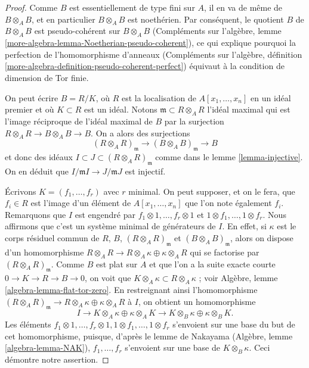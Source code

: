\begin{proof}
Comme $B$ est essentiellement de type fini sur $A$, il en va de même de $B \otimes_A B$, et
en particulier $B \otimes_A B$ est noethérien. Par conséquent, le quotient $B$ de
$B \otimes_A B$ est pseudo-cohérent sur $B \otimes_A B$
(Compléments sur l'algèbre, lemme \ref{more-algebra-lemma-Noetherian-pseudo-coherent}),
ce qui explique pourquoi la perfection de l'homomorphisme d'anneaux (Compléments sur l'algèbre, définition
\ref{more-algebra-definition-pseudo-coherent-perfect}) équivaut à la
condition de dimension de Tor finie.

\medskip\noindent
On peut écrire $B = R/K$, où $R$ est la localisation de $A[x_1, \ldots, x_n]$
en un idéal premier et où $K \subset R$ est un idéal. Notons
$\mathfrak m \subset R \otimes_A R$ l'idéal maximal qui est l'image réciproque
de l'idéal maximal de $B$ par la surjection
$R \otimes_A R \to B \otimes_A B \to B$. On a alors des surjections
$$
(R \otimes_A R)_\mathfrak m \to (B \otimes_A B)_\mathfrak m \to B
$$
et donc des idéaux $I \subset J \subset (R \otimes_A R)_\mathfrak m$
comme dans le lemme \ref{lemma-injective}. On en déduit que
$I/\mathfrak m I \to J/\mathfrak m J$ est injectif.

\medskip\noindent
Écrivons $K = (f_1, \ldots, f_r)$ avec $r$ minimal. On peut supposer, et on le fera,
que $f_i \in R$ est l'image d'un élément de $A[x_1, \ldots, x_n]$ que l'on
note également $f_i$. Remarquons que $I$ est engendré
par $f_1 \otimes 1, \ldots, f_r \otimes 1$ et
$1 \otimes f_1, \ldots, 1 \otimes f_r$. Nous affirmons que c'est un système minimal
de générateurs de $I$. En effet, si $\kappa$ est le corps résiduel commun
de $R$, $B$, $(R \otimes_A R)_\mathfrak m$ et $(B \otimes_A B)_\mathfrak m$,
alors on dispose d'un homomorphisme
$R \otimes_A R \to R \otimes_A \kappa \oplus \kappa \otimes_A R$
qui se factorise par $(R \otimes_A R)_\mathfrak m$. Comme $B$ est
plat sur $A$ et que l'on a la suite exacte courte
$0 \to K \to R \to B \to 0$, on voit que
$K \otimes_A \kappa \subset R \otimes_A \kappa$ ; voir
Algèbre, lemme \ref{algebra-lemma-flat-tor-zero}.
En restreignant ainsi l'homomorphisme
$(R \otimes_A R)_\mathfrak m \to R \otimes_A \kappa \oplus \kappa \otimes_A R$
à $I$, on obtient un homomorphisme
$$
I \to K \otimes_A \kappa \oplus \kappa \otimes_A K \to
K \otimes_B \kappa \oplus \kappa \otimes_B K.
$$
Les éléments
$f_1 \otimes 1, \ldots, f_r \otimes 1, 1 \otimes f_1, \ldots, 1 \otimes f_r$
s'envoient sur une base du but de cet homomorphisme, puisque, d'après le lemme de Nakayama
(Algèbre, lemme \ref{algebra-lemma-NAK}),
$f_1, \ldots, f_r$ s'envoient sur une base de $K \otimes_B \kappa$.
Ceci démontre notre assertion.


\end{proof}
